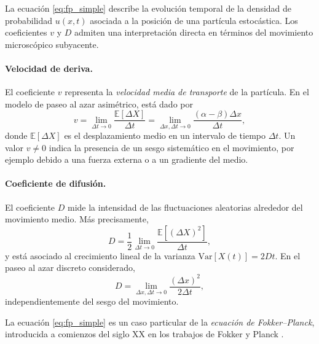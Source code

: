 \documentclass[12pt, a4paper]{amsbook}
\theoremstyle{remark}
\theoremstyle{definition}
\numberwithin{section}{chapter}
\numberwithin{subsection}{section}
\numberwithin{equation}{section}
\numberwithin{figure}{chapter}
\begin{document}
La ecuación \eqref{eq:fp_simple} describe la evolución temporal de la densidad de probabilidad $u(x,t)$ asociada a la posición de una partícula estocástica. Los coeficientes $v$ y $D$ admiten una interpretación directa en términos del movimiento microscópico subyacente.

\paragraph{Velocidad de deriva.}
El coeficiente $v$ representa la \emph{velocidad media de transporte} de la partícula. En el modelo de paseo al azar asimétrico, está dado por
$$
v = \lim_{\Delta t \to 0} \frac{\mathbb{E}[\Delta X]}{\Delta t} = \lim_{\Delta x,\Delta t\to 0} \frac{(\alpha-\beta)\Delta x}{\Delta t},
$$
donde $\mathbb{E}[\Delta X]$ es el desplazamiento medio en un intervalo de tiempo $\Delta t$. Un valor $v\neq 0$ indica la presencia de un sesgo sistemático en el movimiento, por ejemplo debido a una fuerza externa o a un gradiente del medio.

\paragraph{Coeficiente de difusión.}
El coeficiente $D$ mide la intensidad de las fluctuaciones aleatorias alrededor del movimiento medio. Más precisamente,
$$
D = \frac{1}{2}\lim_{\Delta t\to 0} \frac{\mathbb{E}\!\left[(\Delta X)^2\right]}{\Delta t},
$$
y está asociado al crecimiento lineal de la varianza $\mathrm{Var}[X(t)] = 2Dt$. En el paseo al azar discreto considerado,
$$
D = \lim_{\Delta x,\Delta t\to 0} \frac{(\Delta x)^2}{2\Delta t},
$$
independientemente del sesgo del movimiento.


La ecuación \eqref{eq:fp_simple} es un caso particular de la \emph{ecuación de Fokker--Planck}, introducida a comienzos del siglo XX en los trabajos de Fokker y Planck \cite{Fokker,Planck}.


%
\end{document}

